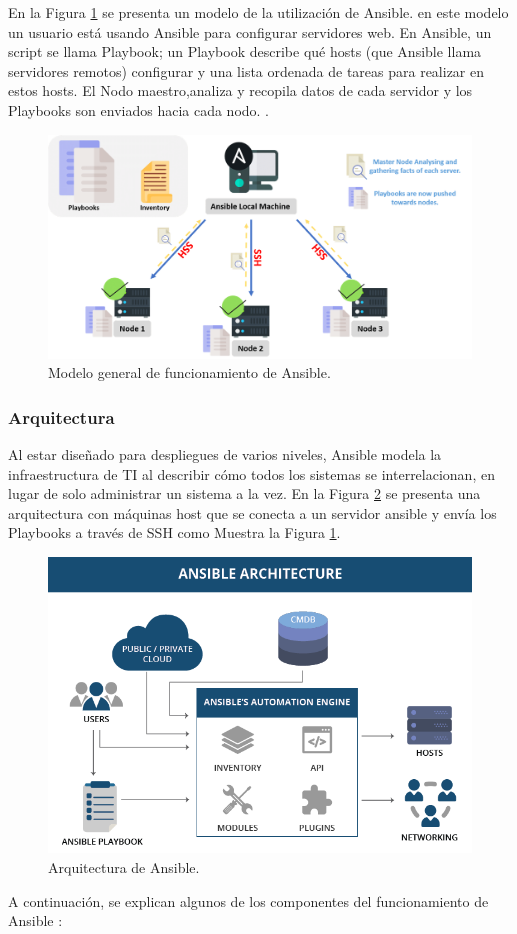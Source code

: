 \par En la Figura \ref{fig:ansible01} se presenta un modelo de la utilización de Ansible. en este modelo un usuario está usando Ansible para configurar servidores web. En Ansible, un script se llama Playbook; un Playbook describe qué hosts (que Ansible llama servidores remotos) configurar y una lista ordenada de tareas para realizar en estos hosts. El Nodo maestro,analiza y recopila datos de cada servidor y los Playbooks son enviados hacia cada nodo. \cite{BOOK13}.\\
\begin{figure}[htpb!]
	\centering
	\includegraphics[width=0.9\columnwidth]{images/ansible01.PNG}
	\caption{Modelo general de funcionamiento de Ansible.}
	\label{fig:ansible01}
\end{figure}

\subsubsection{Arquitectura}
\par Al estar diseñado para despliegues de varios niveles, Ansible modela la infraestructura de TI al describir cómo todos los sistemas se interrelacionan, en lugar de solo administrar un sistema a la vez. En la Figura \ref{fig:ansible02} se presenta una arquitectura con máquinas host que se conecta a un servidor ansible y envía los Playbooks a través de SSH como Muestra la Figura \ref{fig:ansible01}.\\

\begin{figure}[htpb!]
	\centering
	\includegraphics[width=0.8\columnwidth]{images/ansible02.PNG}
	\caption{Arquitectura de Ansible.}
	\label{fig:ansible02}
\end{figure}
\par A continuación, se explican algunos de los componentes del funcionamiento de Ansible \cite{BOOK13}:\\

